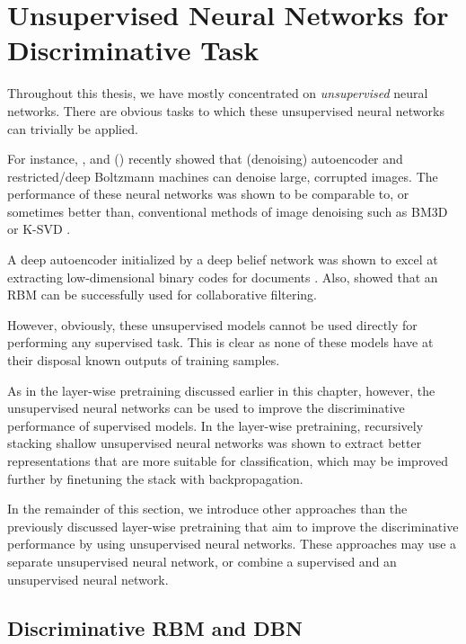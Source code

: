 \documentclass[dissertation,nocontribution,draft*]{aaltoseries}
\begin{document}
\section{Unsupervised Neural Networks for Discriminative
Task}
\label{sec:dunn}

Throughout this thesis, we have mostly concentrated on
\textit{unsupervised} neural networks.  There are obvious
tasks to which these unsupervised neural networks can
trivially be applied.

For instance, \citet{Burger2012}, \citet{Xie2012} and
\citet{Cho2013} () 
recently showed
that (denoising) autoencoder and restricted/deep Boltzmann
machines can denoise large, corrupted images.  The
performance of these neural networks was shown to be
comparable to, or sometimes better than, conventional
methods of image denoising such as BM3D \citep{Dabov2007} or
K-SVD \citep{Portilla2003}.  

A deep autoencoder initialized by a deep belief network
was shown to excel at extracting low-dimensional binary
codes for documents \citep{Salakhutdinov2009s}.  Also,
\citet{Salakhutdinov2007} showed that an RBM can be
successfully used for collaborative filtering. 

However, obviously, these unsupervised models cannot be used
directly for performing any supervised task.  This is
clear as none of these models have at their disposal known
outputs of training samples.

As in the layer-wise pretraining discussed earlier in this
chapter, however, the unsupervised neural networks can be
used to improve the discriminative performance of 
supervised models. In the layer-wise pretraining,
recursively stacking shallow unsupervised neural networks
was shown to extract better representations that are more
suitable for classification, which may be improved further by
finetuning the stack with backpropagation.

In the remainder of this section, we introduce other approaches
than the previously discussed layer-wise pretraining
that aim to improve the discriminative performance by
using unsupervised neural networks. These approaches
may use a separate unsupervised neural network, or combine a
supervised and an unsupervised neural network.

\subsection{Discriminative RBM and DBN}
\label{sec:drbm}
\end{document}
